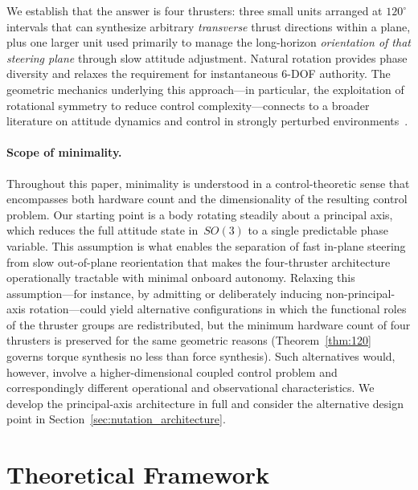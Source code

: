\documentclass{article}
\begin{document}
We establish that the answer is four thrusters: three small units arranged at $120^\circ$ intervals that can synthesize arbitrary \emph{transverse} thrust directions within a plane, plus one larger unit used primarily to manage the long-horizon \emph{orientation of that steering plane} through slow attitude adjustment. Natural rotation provides phase diversity and relaxes the requirement for instantaneous 6-DOF authority. The geometric mechanics underlying this approach---in particular, the exploitation of rotational symmetry to reduce control complexity---connects to a broader literature on attitude dynamics and control in strongly perturbed environments~\cite{sanyal2012attitude,zhou2024orbit}.

\paragraph{Scope of minimality.}
Throughout this paper, minimality is understood in a control-theoretic sense that encompasses
both hardware count and the dimensionality of the resulting control problem. Our starting
point is a body rotating steadily about a principal axis, which reduces the full attitude
state in~$SO(3)$ to a single predictable phase variable. This assumption is what enables the separation of fast in-plane steering from slow
out-of-plane reorientation that makes the four-thruster architecture operationally tractable
with minimal onboard autonomy. Relaxing this assumption---for instance, by admitting or
deliberately inducing non-principal-axis rotation---could yield alternative configurations
in which the functional roles of the thruster groups are redistributed, but the minimum
hardware count of four thrusters is preserved for the same geometric reasons
(Theorem~\ref{thm:120} governs torque synthesis no less than force synthesis). Such
alternatives would, however, involve a higher-dimensional coupled control problem and
correspondingly different operational and observational characteristics. We develop the
principal-axis architecture in full and consider the alternative design point in
Section~\ref{sec:nutation_architecture}.


\section{Theoretical Framework}
\label{sec:framework}
\end{document}
